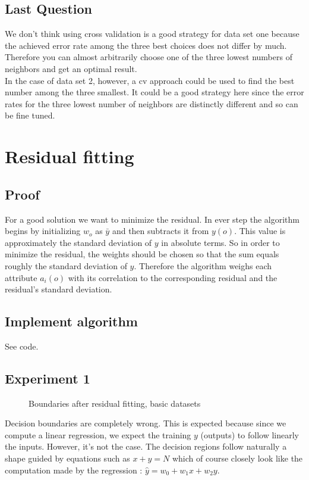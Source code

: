 \documentclass{article}
\begin{document}
\subsection{Last Question}
We don't think using cross validation is a good strategy for data set one because the achieved error rate among the three best choices does not differ by much. Therefore you can almost arbitrarily choose one of the three lowest numbers of neighbors and get an optimal result. \\
In the case of data set 2, however, a cv approach could be used to find the best number among the three smallest. It could be a good strategy here since the error rates for the three lowest number of neighbors are distinctly different and so can be fine tuned. 

\section{Residual fitting}
\subsection{Proof}
For a good solution we want to minimize the residual. In ever step the algorithm begins by initializing \(w_o\) as \(\bar{y}\) and then subtracts it from \(y(o)\). This value is approximately the standard deviation of \(y\) in absolute terms. So in order to minimize the residual, the weights should be chosen so that the sum equals roughly the standard deviation of \(y\). Therefore the algorithm weighs each attribute \(a_i(o)\) with its correlation to the corresponding residual and the residual's standard deviation.   
\subsection{Implement algorithm}
See code.
\subsection{Experiment 1}
	\begin{figure}[H]
	\centering
	
	\caption{\label{resfit1}Boundaries after residual fitting, basic datasets}
     \end{figure}

Decision boundaries are completely wrong.
This is expected because since we compute a linear regression, we expect
the training $y$ (outputs) to follow linearly the inputs. However, it's not the case. The decision  regions follow naturally a shape guided by equations such as $x + y = N$ which of course closely look like the computation made by the regression :  $\hat{y} = w_0 + w_1 x + w_2 y$.
\end{document}
